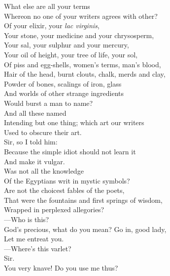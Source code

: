 \documentclass[a4paper,oneside,12pt]{memoir}
\begin{document}
\begin{drama*}
\surlyspeaks {} What else are all your terms\\
Whereon no one of your writers agrees with other?\\
Of your elixir, your \emph{lac virginis},\\
Your stone, your medicine and your chrysosperm,\\
Your sal, your sulphur and your mercury,\\
Your oil of height, your tree of life, your sol,\\
Of piss and egg-shells, women's terms, man's blood,\\
Hair of the head, burnt clouts, chalk, merds and clay,\\
Powder of bones, scalings of iron, glass\\
And worlds of other strange ingredients\\
Would burst a man to name?\\
\subtlespeaks {} And all these named\\
Intending but one thing; which art our writers\\
Used to obscure their art.\\
\mammonspeaks {} Sir, so I told him:\\
Because the simple idiot should not learn it\\
And make it vulgar.\\
\subtlespeaks {} Was not all the knowledge\\
Of the Egyptians writ in mystic symbols?\\
Are not the choicest fables of the poets,\\
That were the fountains and first springs of wisdom,\\
Wrapped in perplexed allegories?\\
\mammonspeaks {} ---Who is this?\\
\subtlespeaks God's precious, what do you mean? Go in, good lady,\\
Let me entreat you.\\
 ---Where's this varlet?\\
\facespeaks {} Sir.\\
\subtlespeaks You very knave! Do you use me thus?\\

\end{drama*}
\end{document}
